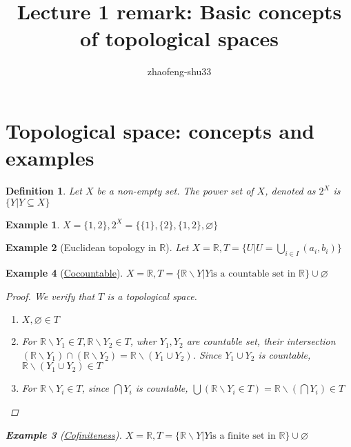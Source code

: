\documentclass{article}
\def\emptyset{\varnothing}
\newtheorem{example}{Example}[section] %
\newtheorem{definition}{Definition}[section]
\begin{document}
% 
\title{Lecture 1 remark: Basic concepts of topological spaces}
\author{zhaofeng-shu33}
\maketitle
\section{Topological space: concepts and examples}
\setcounter{definition}{-1}
\begin{definition}
Let $X$ be a non-empty set. The power set of $X$, denoted as $2^{X}$ is $\{Y|Y\subseteq X\}$
\end{definition}
\setcounter{example}{-1}
\begin{example}
$X=\{1,2\},2^X=\{\{1\},\{2\},\{1,2\},\emptyset\}$
\end{example}
\begin{example}[Euclidean topology in $\mathbb{R}$]
Let $X=\mathbb{R},T=\{U| U=\bigcup_{i\in I}(a_i,b_i)\}$
\end{example}
\setcounter{example}{3}
\begin{example}[\href{https://en.wikipedia.org/wiki/Cocountable}{Cocountable}]
$X=\mathbb{R},T=\{\mathbb{R}\backslash Y| Y \textrm{is a countable set in }\mathbb{R} \}\cup \emptyset$
\begin{proof}


We verify that $T$ is a topological space.
\begin{enumerate}
\item $X,\emptyset \in T$
\item For $\mathbb{R}\backslash Y_1\in T,\mathbb{R}\backslash Y_2\in T$, wher $Y_1,Y_2$ are countable set, their intersection
$(\mathbb{R}\backslash Y_1 )\cap (\mathbb{R}\backslash Y_2)=\mathbb{R}\backslash(Y_1\cup Y_2)$. Since $Y_1\cup Y_2$ is countable,
$\mathbb{R}\backslash(Y_1\cup Y_2)\in T$
\item For $\mathbb{R}\backslash Y_i\in T$, since $\bigcap Y_i$ is countable, 
$\bigcup(\mathbb{R}\backslash Y_i\in T)= \mathbb{R}\backslash(\bigcap Y_i) \in T$
\end{enumerate}
\end{proof}
\begin{example}[\href{https://en.wikipedia.org/wiki/Cofiniteness}{Cofiniteness}]
$X=\mathbb{R},T=\{\mathbb{R}\backslash Y| Y \textrm{is a finite set in }\mathbb{R} \}\cup \emptyset$
\end{example}
\end{example}
\setcounter{example}{5}
\end{document}
